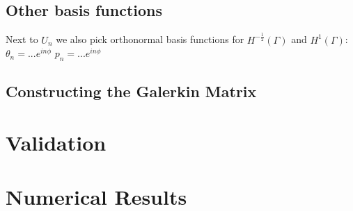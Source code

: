 \documentclass[10pt,journal,compsoc]{IEEEtran}
\begin{document}
\subsection{Other basis functions}
Next to $U_n$ we also pick orthonormal basis functions for $H^{-\frac{1}{2}}(\Gamma)$ and $H^1(\Gamma)$: 
$\theta_n = ... e^{i n \phi}$
$p_n = ... e^{i n \phi}$

 \subsection*{Constructing the Galerkin Matrix}

\section{Validation}


\section{Numerical Results}

%
%
%
\end{document}
